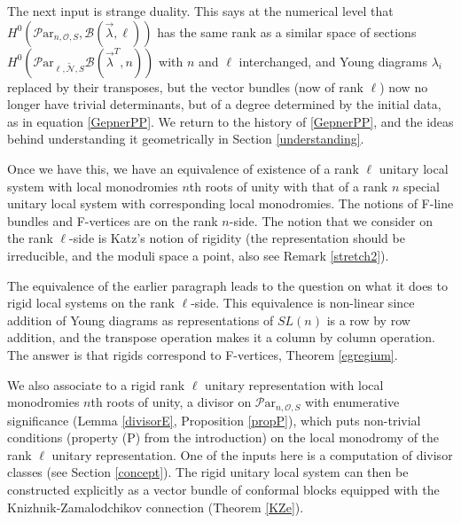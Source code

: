 \documentclass[11pt]{amsart}
\newcommand\Par{\mathcal{P}\text{ar} }
\numberwithin{theorem}{subsection}
\begin{document}
{The next input is strange duality. This says at the numerical level that $H^0(\Par_{n,\mathcal{O},S},\mathcal{B}(\vec{\lambda},\ell))$ has the same rank as a similar space of sections $H^0(\Par_{\ell,\widetilde{\mathcal{N}},S}\mathcal{B}(\vec{\lambda}^T,n))$ with $n$ and $\ell$ interchanged, and Young diagrams $\lambda_i$ replaced by their transposes, but the vector bundles (now of rank $\ell$)  now no longer have trivial determinants, but of a degree determined by the initial data, as in equation \eqref{GepnerPP}. We return to the history of \eqref{GepnerPP}, and the ideas behind understanding it geometrically in Section \ref{understanding}.


Once we have this, we have an equivalence of existence of a rank $\ell$ unitary local system with local monodromies $n$th roots of unity with that of a rank $n$ special unitary local system with corresponding local monodromies. The notions of F-line bundles and F-vertices are on the rank $n$-side. The notion that we consider on the rank $\ell$-side is Katz's notion of rigidity (the  representation should be irreducible, and the moduli space a point, also see Remark \ref{stretch2}).

The equivalence of the earlier paragraph leads to the question on what it does to rigid local systems on the rank $\ell$-side. This equivalence is non-linear since addition of Young diagrams as representations of $SL(n)$ is a row by row addition, and the transpose operation makes it a column by column operation. The answer is that rigids correspond to F-vertices, Theorem \ref{egregium}. %

We also associate to a rigid rank $\ell$ unitary representation with local monodromies $n$th roots of unity, a divisor on $\Par_{n,\mathcal{O},S }$ with enumerative significance (Lemma \ref{divisorE}, Proposition \ref{propP}), which puts non-trivial conditions (property (P) from the introduction) on the local monodromy of the rank $\ell$ unitary representation. One of the inputs here is a computation of divisor classes (see Section \ref{concept}).
The rigid unitary local system can then be constructed explicitly as a vector bundle of conformal blocks  equipped with the  Knizhnik-Zamalodchikov connection (Theorem \ref{KZe}).

}
\end{document}
